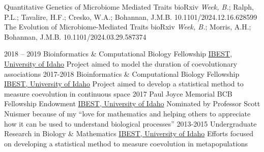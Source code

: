 \documentclass[9pt]{developercv} %
\begin{document}
\vspace{-5 pt}
\begin{publist}
		{Quantitative Genetics of Microbiome Mediated Traits}
		{bioRxiv}
		{\emph{Week, B.}; Ralph, P.L.; Tavalire, H.F.; Cresko, W.A.; Bohannan, J.M.B.}
        {10.1101/2024.12.16.628599}
		{The Evolution of Microbiome-Mediated Traits}
		{bioRxiv}
		{\emph{Week, B.}; Morris, A.H.; Bohannan, J.M.B.}
        {10.1101/2024.03.29.587374}
\end{publist}


\vspace{-10 pt}
\begin{entrylist}
    \entry
        {2018 -- 2019}
        {Bioinformatics \& Computational Biology Fellowship}
        {\href{https://www.iids.uidaho.edu/about.php}{IBEST, University of Idaho}}
        {Project aimed to model the duration of coevolutionary associations}
    \entry
        {2017-2018}
        {Bioinformatics \& Computational Biology Fellowship}
        {\href{https://www.iids.uidaho.edu/about.php}{IBEST, University of Idaho}}
        {Project aimed to develop a statistical method to measure coevolution in continuous space}
    \entry
        {2017}
        {Paul Joyce Memorial BCB Fellowship Endowment}
        {\href{https://www.iids.uidaho.edu/about.php}{IBEST, University of Idaho}}
        {Nominated by Professor Scott Nuismer because of my “love for mathematics and helping others to appreciate how it can be used to understand biological processes”}
    \entry
        {2013-2015}
        {Undergraduate Research in Biology \& Mathematics}
        {\href{https://www.iids.uidaho.edu/about.php}{IBEST, University of Idaho}}
        {Efforts focused on developing a statistical method to measure coevolution in metapopulations}
\end{entrylist}
\end{document}
